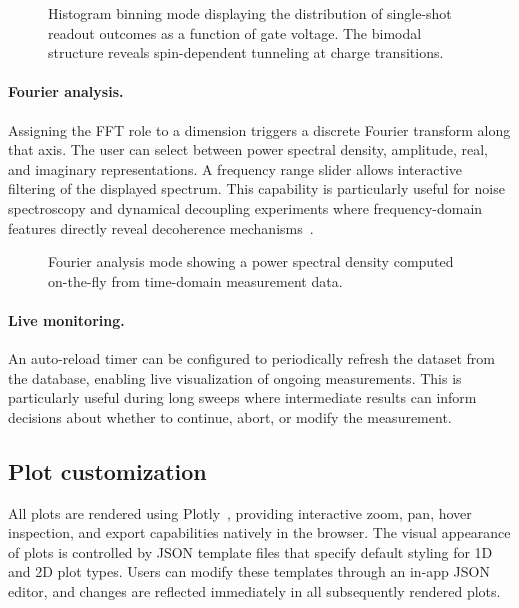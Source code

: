 \begin{figure}[H]
\caption{Histogram binning mode displaying the distribution of single-shot readout outcomes as a function of gate voltage. The bimodal structure reveals spin-dependent tunneling at charge transitions.}
\label{fig:inspector_histogram}
\end{figure}

\paragraph{Fourier analysis.}
Assigning the FFT role to a dimension triggers a discrete Fourier transform along that axis.
The user can select between power spectral density, amplitude, real, and imaginary representations.
A frequency range slider allows interactive filtering of the displayed spectrum.
This capability is particularly useful for noise spectroscopy and dynamical decoupling experiments where frequency-domain features directly reveal decoherence mechanisms~\cite{stuyck2024noise}.


\begin{figure}[H]
\caption{Fourier analysis mode showing a power spectral density computed on-the-fly from time-domain measurement data.}
\label{fig:inspector_fft}
\end{figure}

\paragraph{Live monitoring.}
An auto-reload timer can be configured to periodically refresh the dataset from the database, enabling live visualization of ongoing measurements.
This is particularly useful during long sweeps where intermediate results can inform decisions about whether to continue, abort, or modify the measurement.

\subsection{Plot customization}

All plots are rendered using Plotly~\cite{plotly}, providing interactive zoom, pan, hover inspection, and export capabilities natively in the browser.
The visual appearance of plots is controlled by JSON template files that specify default styling for 1D and 2D plot types.
Users can modify these templates through an in-app JSON editor, and changes are reflected immediately in all subsequently rendered plots.

